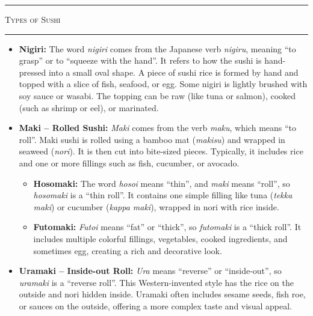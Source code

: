 \documentclass[landscape, a4paper]{article}
\newcommand\alert[1]{\textcolor{PrimaryColor}{\textbf{#1}}}
\begin{document}
\begin{minipage}[t]{0.31\textwidth}
	\vspace{0.5cm}
	\setlength{\parskip}{0.25cm}

	\textcolor{PrimaryColor}{
		\rule{\linewidth}{0.5mm}
		\vspace{-0.1cm}
		\begin{center}
			\large
			\textsc{Types of Sushi}
		\end{center}
		\rule{\linewidth}{0.5mm}
	}

	\begin{itemize}
		\item \alert{Nigiri:}
		The word \textit{nigiri} comes from the Japanese verb \textit{nigiru}, meaning \enquote{to grasp} or to \enquote{squeeze with the hand}. It refers to how the sushi is hand-pressed into a small oval shape.
		A piece of sushi rice is formed by hand and topped with a slice of fish, seafood, or egg. Some nigiri is lightly brushed with soy sauce or wasabi. The topping can be raw (like tuna or salmon), cooked (such as shrimp or eel), or marinated.

		\item \alert{Maki – Rolled Sushi:}
		\textit{Maki} comes from the verb \textit{maku}, which means \enquote{to roll}. Maki sushi is rolled using a bamboo mat (\textit{makisu}) and wrapped in seaweed (\textit{nori}). It is then cut into bite-sized pieces. Typically, it includes rice and one or more fillings such as fish, cucumber, or avocado.
		\begin{itemize}
			\item \alert{Hosomaki:}
			The word \textit{hosoi} means \enquote{thin}, and \textit{maki} means \enquote{roll}, so \textit{hosomaki} is a \enquote{thin roll}. It contains one simple filling like tuna (\textit{tekka maki}) or cucumber (\textit{kappa maki}), wrapped in nori with rice inside.

			\item \alert{Futomaki:}
			\textit{Futoi} means \enquote{fat} or \enquote{thick}, so \textit{futomaki} is a \enquote{thick roll}. It includes multiple colorful fillings, vegetables, cooked ingredients, and sometimes egg, creating a rich and decorative look.
		\end{itemize}

		\item \alert{Uramaki – Inside-out Roll:}
		\textit{Ura} means \enquote{reverse} or \enquote{inside-out}, so \textit{uramaki} is a \enquote{reverse roll}. This Western-invented style has the rice on the outside and nori hidden inside. Uramaki often includes sesame seeds, fish roe, or sauces on the outside, offering a more complex taste and visual appeal.
	\end{itemize}


\end{minipage}
\end{document}

